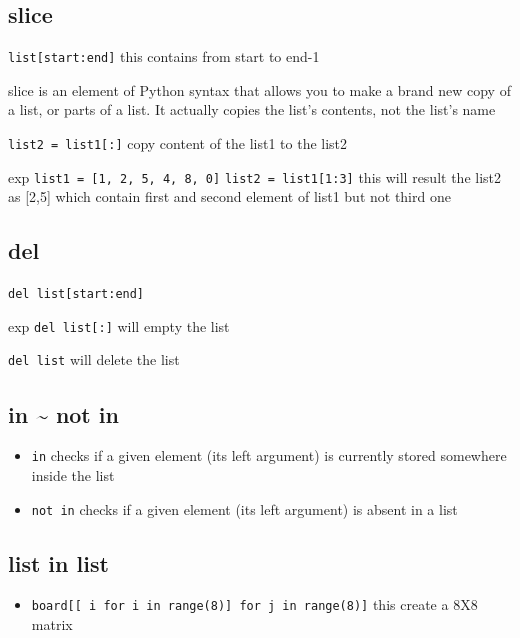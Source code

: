 \documentclass[11pt]{article}
\begin{document}
\subsection{slice}
\label{sec:orgaba20ea}
\begin{description}
\item[{syntax}] \texttt{list[start:end]}
this contains from start to end-1
\item slice is an element of Python syntax that allows you to make a brand
new copy of a list, or parts of a list. It actually copies the list’s
contents, not the list’s name
\item \texttt{list2 = list1[:]} 
copy content of the list1 to the list2
\item exp
\texttt{list1 = [1, 2, 5, 4, 8, 0]} 
\texttt{list2 = list1[1:3]} 
this will result the list2 as [2,5] which contain
first and second element of list1 but not third one
\end{description}

\subsection{del}
\label{sec:orga5a506f}
\begin{description}
\item[{syntax}] \texttt{del list[start:end]}
\item exp \texttt{del list[:]} will empty the list
\item[{syntax}] \texttt{del list} will delete the list
\end{description}
\subsection{in \textasciitilde{} not in}
\label{sec:org41dc788}
\begin{itemize}
\item \texttt{in} checks if a given element (its left argument) is currently
stored somewhere inside the list
\item \texttt{not in} checks if a given element (its left argument) is absent in
a list
\end{itemize}
\subsection{list in list}
\label{sec:org8130551}
\begin{itemize}
\item \texttt{board[[ i for i in range(8)] for j in range(8)]}
this create a 8X8 matrix
\end{itemize}
\end{document}
